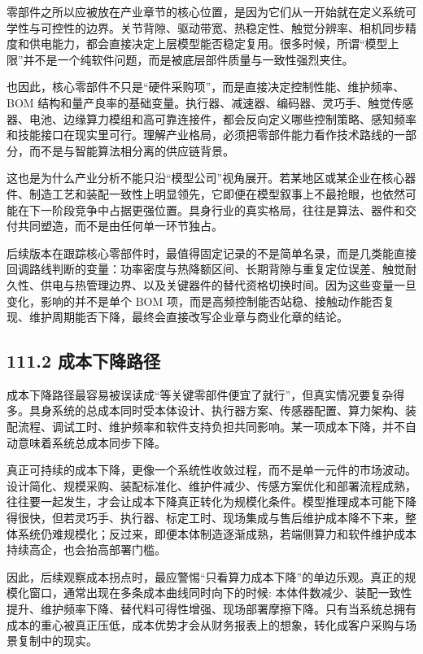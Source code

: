 零部件之所以应被放在产业章节的核心位置，是因为它们从一开始就在定义系统可学性与可控性的边界。关节背隙、驱动带宽、热稳定性、触觉分辨率、相机同步精度和供电能力，都会直接决定上层模型能否稳定复用。很多时候，所谓“模型上限”并不是一个纯软件问题，而是被底层部件质量与一致性强烈夹住。

也因此，核心零部件不只是“硬件采购项”，而是直接决定控制性能、维护频率、BOM 结构和量产良率的基础变量。执行器、减速器、编码器、灵巧手、触觉传感器、电池、边缘算力模组和高可靠连接件，都会反向定义哪些控制策略、感知频率和技能接口在现实里可行。理解产业格局，必须把零部件能力看作技术路线的一部分，而不是与智能算法相分离的供应链背景。

这也是为什么产业分析不能只沿“模型公司”视角展开。若某地区或某企业在核心器件、制造工艺和装配一致性上明显领先，它即便在模型叙事上不最抢眼，也依然可能在下一阶段竞争中占据更强位置。具身行业的真实格局，往往是算法、器件和交付共同塑造，而不是由任何单一环节独占。

后续版本在跟踪核心零部件时，最值得固定记录的不是简单名录，而是几类能直接回调路线判断的变量：功率密度与热降额区间、长期背隙与重复定位误差、触觉耐久性、供电与热管理边界、以及关键器件的替代资格切换时间。因为这些变量一旦变化，影响的并不是单个 BOM 项，而是高频控制能否站稳、接触动作能否复现、维护周期能否下降，最终会直接改写企业章与商业化章的结论。

\subsection*{111.2 成本下降路径}


成本下降路径最容易被误读成“等关键零部件便宜了就行”，但真实情况要复杂得多。具身系统的总成本同时受本体设计、执行器方案、传感器配置、算力架构、装配流程、调试工时、维护频率和软件支持负担共同影响。某一项成本下降，并不自动意味着系统总成本同步下降。

真正可持续的成本下降，更像一个系统性收敛过程，而不是单一元件的市场波动。设计简化、规模采购、装配标准化、维护件减少、传感方案优化和部署流程成熟，往往要一起发生，才会让成本下降真正转化为规模化条件。模型推理成本可能下降得很快，但若灵巧手、执行器、标定工时、现场集成与售后维护成本降不下来，整体系统仍难规模化；反过来，即便本体制造逐渐成熟，若端侧算力和软件维护成本持续高企，也会抬高部署门槛。

因此，后续观察成本拐点时，最应警惕“只看算力成本下降”的单边乐观。真正的规模化窗口，通常出现在多条成本曲线同时向下的时候: 本体件数减少、装配一致性提升、维护频率下降、替代料可得性增强、现场部署摩擦下降。只有当系统总拥有成本的重心被真正压低，成本优势才会从财务报表上的想象，转化成客户采购与场景复制中的现实。

